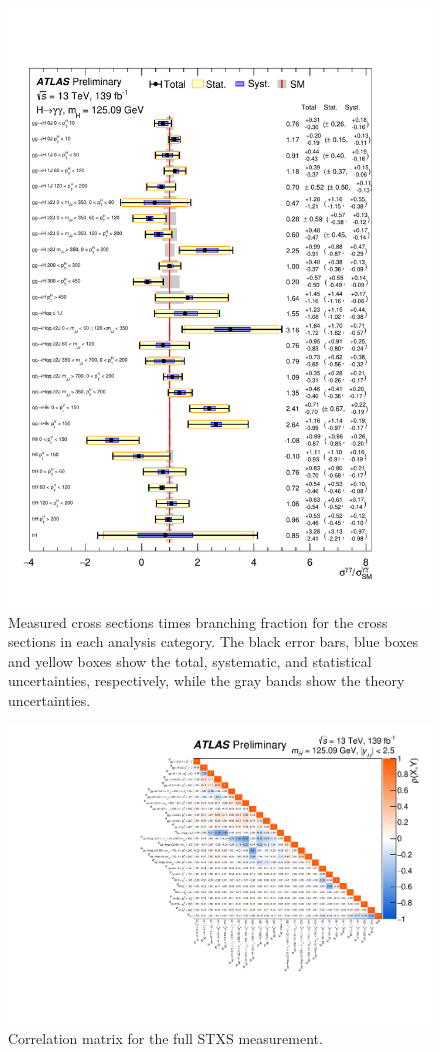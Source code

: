 \begin{figure}[!tp]
  \centering
  \includegraphics[width=.875\textwidth]{figures/couplings_chapter/summary_stxs.pdf}
  \vspace{-10pt}
  \caption{Measured cross sections times branching fraction for the cross sections in each analysis category. The black error bars, blue boxes and yellow boxes show the total, systematic, and statistical uncertainties, respectively, while the gray bands show the theory uncertainties.}
  \label{fig:results:STXS}
\end{figure}

\begin{figure}[!tpb]
\centering
\includegraphics[width=.995\textwidth]{figures/couplings_chapter/corrmat_STXS_obs.pdf}
\caption{Correlation matrix for the full STXS measurement.
}
\label{fig:results:STXS_corr}
\end{figure}

